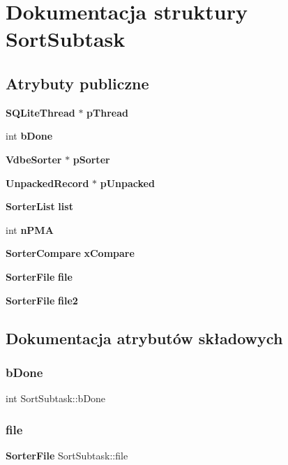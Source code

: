 \section{Dokumentacja struktury Sort\+Subtask}
\label{struct_sort_subtask}
\subsection*{Atrybuty publiczne}
\begin{DoxyCompactItemize}
\item 
\textbf{ S\+Q\+Lite\+Thread} $\ast$ \textbf{ p\+Thread}
\item 
int \textbf{ b\+Done}
\item 
\textbf{ Vdbe\+Sorter} $\ast$ \textbf{ p\+Sorter}
\item 
\textbf{ Unpacked\+Record} $\ast$ \textbf{ p\+Unpacked}
\item 
\textbf{ Sorter\+List} \textbf{ list}
\item 
int \textbf{ n\+P\+MA}
\item 
\textbf{ Sorter\+Compare} \textbf{ x\+Compare}
\item 
\textbf{ Sorter\+File} \textbf{ file}
\item 
\textbf{ Sorter\+File} \textbf{ file2}
\end{DoxyCompactItemize}


\subsection{Dokumentacja atrybutów składowych}
\mbox{\label{struct_sort_subtask_a156fc75053f13e877c36d80885338060}} 
\subsubsection{bDone}
{\footnotesize\ttfamily int Sort\+Subtask\+::b\+Done}

\mbox{\label{struct_sort_subtask_a077f999ff1e4148e48bd8df25092fd85}} 
\subsubsection{file}
{\footnotesize\ttfamily \textbf{ Sorter\+File} Sort\+Subtask\+::file}

\mbox{\label{struct_sort_subtask_a23b46687f7a96ef1052a062f8097234e}} 
